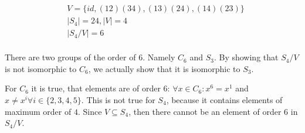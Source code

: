 \documentclass[a4paper]{article}
\begin{document}
\thispagestyle{fancy} %
{}







\begin{align*}
	& V = \{id, (12)(34), (13)(24), (14)(23)\} \\
	& |S_4| = 24, |V| = 4 \\
	& |S_4/V| = 6 \\
\end{align*}

There are two groups of the order of $6$. Namely $C_6$ and $S_3$. By showing that $S_4/V$ is not isomorphic to $C_6$, we actually show that it is isomorphic to $S_3$.

For $C_6$ it is true, that elements are of order 6: $\forall x \in C_6: x^6 = x^1$ and $x \ne x^i \forall i \in \{2,3,4,5\}$. This is not true for $S_4$, because it contains elements of maximum order of $4$. Since $V \subseteq S_4$, then there cannot be an element of order 6 in $S_4/V$.
\end{document}
